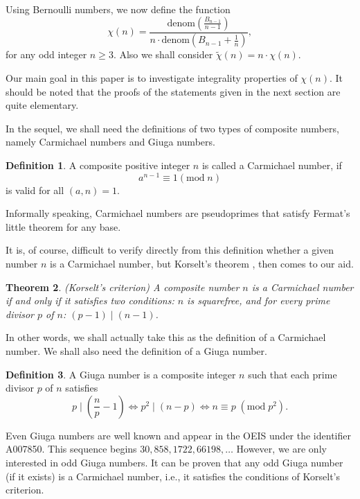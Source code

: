 \documentclass[reqno,a4paper,11pt]{amsart}
\numberwithin{equation}{section}
\newtheorem{theorem}{Theorem}[section]
\theoremstyle{definition}
\newtheorem{definition}[theorem]{Definition}
\begin{document}
Using Bernoulli numbers, we now define the function
\[
\chi(n)=\frac{\mathrm{denom}\left(\displaystyle\frac{B_{n-1}}{n-1}\right)}{n\cdot\mathrm{denom}\left(B_{n-1}+\displaystyle\frac{1}{n}\right)},
\]
for any odd integer $n\geq 3$.  Also we shall consider  $\tilde{\chi}(n)=n\cdot \chi(n)$. 

Our main goal in this paper is to investigate   integrality properties of $\chi(n)$.  It should be noted that the proofs of the statements given in the next section are quite elementary.

In the sequel, we shall  need the definitions of two types of composite numbers, namely Carmichael numbers and Giuga numbers. 
\begin{definition}
A composite positive integer $n$ is called a Carmichael number, if 
\[
a^{n-1}\equiv 1\left(\mathrm{mod}\; n\right)
\]
is valid for all $(a, n) = 1$.
\end{definition}
Informally speaking, Carmichael numbers are pseudoprimes that satisfy Fermat's little theorem for any base. 

It is, of course, difficult to verify directly from this definition whether a given number $n$ is a Carmichael number, but Korselt's theorem \cite{Crandall}, \cite{Korselt} then comes to our aid.
\begin{theorem}  (Korselt's criterion) 
A composite number $n$ is a Carmichael number if and only if it satisfies two conditions: $n$ is squarefree, and for every prime divisor $p$ of $n$:  $\left(p-1\right)\mid  \left(n-1\right)$. 
\end{theorem}  
In other words, we shall actually take this as the definition of a Carmichael number. We shall also need the definition of a Giuga number.
\begin{definition}
A Giuga number is a composite integer $n$ such that each prime divisor $p$ of $n$ satisfies 
\begin{equation}
p\mid \left(\frac{n}{p}-1\right) \Leftrightarrow p^2\mid (n-p) \Leftrightarrow n\equiv p\; (\mathrm{mod}\; p^2).
\label{867434}
\end{equation}
\end{definition}
Even Giuga numbers are well known and appear in the OEIS under the identifier \textrm{A007850}. This sequence begins $30, 858, 1722, 66198,\ldots$ However, we are only interested in odd Giuga numbers. It can be proven that any odd Giuga number (if it exists) is a Carmichael number, i.e., it satisfies the conditions of Korselt's criterion. 
\end{document}

